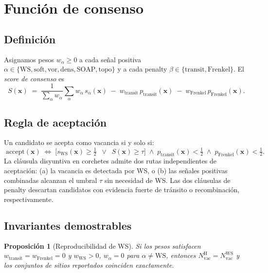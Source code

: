 \documentclass[11pt,a4paper]{article}
\newtheorem{prop}{Proposición}
\theoremstyle{remark}
\begin{document}
\section{Función de consenso}

\subsection{Definición}
\label{sec:consensus}

Asignamos pesos $w_\alpha \geq 0$ a cada señal positiva
$\alpha \in \{\text{WS}, \text{soft}, \text{vor}, \text{dens},
\text{SOAP}, \text{topo}\}$ y a cada penalty
$\beta \in \{\text{transit}, \text{Frenkel}\}$. El \emph{score de
consenso} es
\begin{equation}
  S(\mathbf{x}) \;=\;
  \frac{1}{\sum_\alpha w_\alpha}
  \sum_\alpha w_\alpha\, s_\alpha(\mathbf{x})
  \;-\; w_\text{transit}\,p_\text{transit}(\mathbf{x})
  \;-\; w_\text{Frenkel}\,p_\text{Frenkel}(\mathbf{x}).
  \label{eq:consensus}
\end{equation}

\subsection{Regla de aceptación}

Un candidato se acepta como vacancia si y solo si:
\begin{equation}
  \boxed{
  \;\text{accept}(\mathbf{x}) \;\Longleftrightarrow\;
  \bigl[s_\text{WS}(\mathbf{x}) \geq \tfrac{1}{2}
        \;\;\vee\;\; S(\mathbf{x}) \geq \tau\bigr]
  \;\wedge\; p_\text{transit}(\mathbf{x}) < \tfrac{1}{2}
  \;\wedge\; p_\text{Frenkel}(\mathbf{x}) < \tfrac{1}{2}.\;}
  \label{eq:accept}
\end{equation}
La cláusula disyuntiva en corchetes admite dos rutas independientes
de aceptación: (a) la vacancia es detectada por WS, o (b) las señales
positivas combinadas alcanzan el umbral $\tau$ sin necesidad de WS.
Las dos cláusulas de penalty descartan candidatos con evidencia
fuerte de tránsito o recombinación, respectivamente.

\subsection{Invariantes demostrables}

\begin{prop}[Reproducibilidad de WS]
\label{prop:ws-invariant}
Si los pesos satisfacen $w_\text{transit} = w_\text{Frenkel} = 0$
y $w_\text{WS} > 0$, $w_\alpha = 0$ para $\alpha \neq \text{WS}$,
entonces
$N_\text{vac}^\text{H} = N_\text{vac}^\text{WS}$ y los conjuntos
de sitios reportados coinciden exactamente.
\end{prop}
\end{document}
